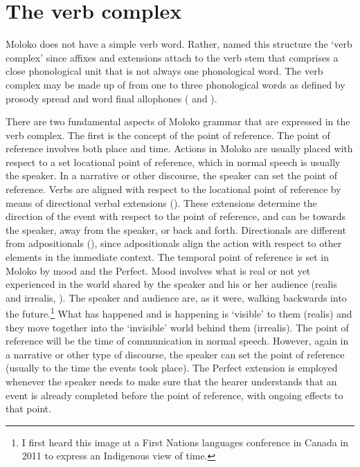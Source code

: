 \chapter[The verb complex]{The verb complex}\label{chap:7}
\hypertarget{RefHeading1212081525720847}{}
Moloko does not have a simple verb word. Rather, \citet{FriesenMamalis2008} named this structure the ‘verb complex’ since affixes and extensions attach to the verb stem that comprises a close phonological unit that is not always one phonological word. The verb complex may be made up of from one to three phonological words as defined by prosody spread and word final allophones ( and ). 

There are two fundamental aspects of Moloko grammar that are expressed in the verb complex. The first is the concept of the point of reference. The point of reference involves both place and time. Actions in Moloko are usually placed with respect to a set locational point of reference, which in normal speech is usually the speaker. In a narrative or other discourse, the speaker can set the point of reference. Verbs are aligned with respect to the locational point of reference by means of directional verbal extensions (). These extensions determine the direction of the event with respect to the point of reference, and can be towards the speaker, away from the speaker, or back and forth. Directionals are different from adpositionals (), since adpositionals align the action with respect to other elements in the immediate context. The temporal point of reference is set in Moloko by mood and the Perfect. Mood involves what is real or not yet experienced in the world shared by the speaker and his or her audience (realis and irrealis, ). The speaker and audience are, as it were, walking backwards into the future.\footnote{I first heard this image at a First Nations languages conference in Canada in 2011 to express an Indigenous view of time. } What has happened and is happening is ‘visible’ to them (realis) and they move together into the ‘invisible’ world behind them (irrealis). The point of reference will be the time of communication in normal speech. However, again in a narrative or other type of discourse, the speaker can set the point of reference (usually to the time the events took place). The Perfect extension is employed whenever the speaker needs to make sure that the hearer understands that an event is already completed before the point of reference, with ongoing effects to that point. 

